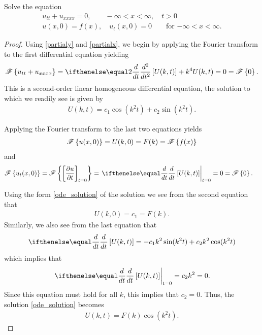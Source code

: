 \begin{problem}{2.12}
  Solve the equation
  \begin{align*}
    u_{tt} + u_{xxxx} = 0, \qquad -\infty < x < \infty, \quad t > 0 \\
    u(x, 0) = f(x),\quad u_t(x, 0) = 0 \qquad \text{for $-\infty < x < \infty$}.
  \end{align*}
\end{problem}

\begin{proof}
  Using \eqref{partialy} and \eqref{partialx}, we begin by applying the Fourier transform to the first differential equation yielding
  \begin{align*}
    \fourier{u_{tt} + u_{xxxx}} = \der{t}{2}\left[U(k, t)\right] + k^4 U(k, t) = 0 = \fourier{0}.
  \end{align*}
  This is a second-order linear homogeneous differential equation, the solution to which we readily see is given by
  \begin{align}\label{ode_solution}
    U(k, t) = c_1 \cos(k^2 t) + c_2 \sin(k^2 t).
  \end{align}

  Applying the Fourier transform to the last two equations yields
  \begin{align*}
    \mathscr{F}\left\{ {u(x, 0)} \right\} = U(k, 0) = F(k) = \mathscr{F}\left\{ {f(x)} \right\}
  \end{align*}
  and
  \begin{align*}
    \fourier{u_t(x, 0)} = \fourier{\left[\frac{\partial u}{\partial t}\right]_{t=0}} &= \left.\der{t}{}\left[U(k, t)\right]\right\rvert_{t=0} = 0 = \fourier{0}.
  \end{align*}

  Using the form \eqref{ode_solution} of the solution we see from the second equation that
  \begin{align*}
    U(k, 0) = c_1 = F(k).
  \end{align*}
  Similarly, we also see from the last equation that
  \begin{align*}
    \der{t}{}\left[U(k, t)\right] = -c_1 k^2 \sin(k^2 t) + c_2 k^2 \cos(k^2 t)
  \end{align*}
  which implies that
  \begin{align*}
    \left.\der{t}{}\left[U(k, t)\right]\right\rvert_{t=0} = c_2 k^2 = 0.
  \end{align*}
  Since this equation must hold for all $k$, this implies that $c_2 = 0$.
  Thus, the solution \eqref{ode_solution} becomes
  \begin{align*}
    U(k,t) = F(k)\cos(k^2t).
  \end{align*}


\end{proof}
